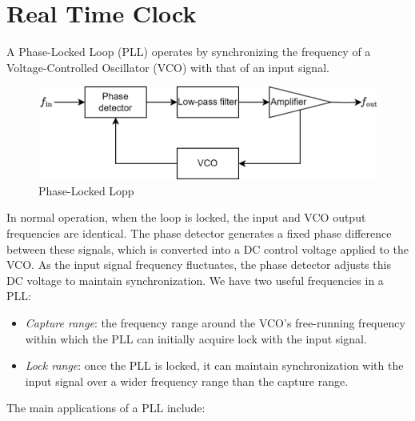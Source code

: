 \section{Real Time Clock}

A Phase-Locked Loop (PLL) operates by synchronizing the frequency of a Voltage-Controlled Oscillator (VCO) with that of an input signal.
\begin{figure}[H]
    \centering
    \includegraphics[width=0.75\linewidth]{images/pll.png}
    \caption{Phase-Locked Lopp}
\end{figure}
In normal operation, when the loop is locked, the input and VCO output frequencies are identical. 
The phase detector generates a fixed phase difference between these signals, which is converted into a DC control voltage applied to the VCO. 
As the input signal frequency fluctuates, the phase detector adjusts this DC voltage to maintain synchronization.
We have two useful frequencies in a PLL:
\begin{itemize}
    \item \textit{Capture range}: the frequency range around the VCO's free-running frequency within which the PLL can initially acquire lock with the input signal.
    \item \textit{Lock range}: once the PLL is locked, it can maintain synchronization with the input signal over a wider frequency range than the capture range. 
\end{itemize}
The main applications of a PLL include:

